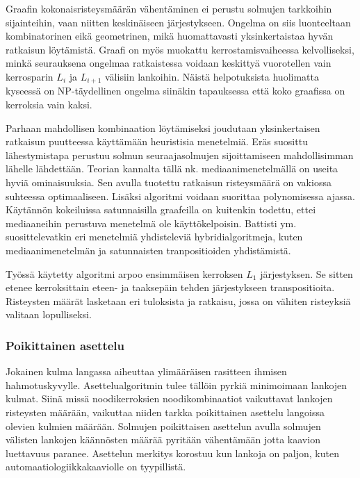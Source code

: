 \documentclass[finnish,12pt]{article}
\begin{document}
Graafin kokonaisristeysmäärän vähentäminen ei perustu solmujen tarkkoihin sijainteihin, vaan niitten keskinäiseen järjestykseen.
Ongelma on siis luonteeltaan kombinatorinen eikä geometrinen, mikä huomattavasti yksinkertaistaa hyvän ratkaisun löytämistä.
Graafi on myös muokattu kerrostamisvaiheessa kelvolliseksi, minkä seurauksena ongelmaa ratkaistessa voidaan keskittyä vuorotellen vain kerrosparin $L_i$ ja $L_{i+1}$ välisiin lankoihin.
Näistä helpotuksista huolimatta kyseessä on NP-täydellinen ongelma siinäkin tapauksessa että koko graafissa on kerroksia vain kaksi. \cite{RefWorks:40}

Parhaan mahdollisen kombinaation löytämiseksi joudutaan yksinkertaisen ratkaisun puutteessa käyttämään heuristisia menetelmiä.
Eräs suosittu lähestymistapa perustuu solmun seuraajasolmujen sijoittamiseen mahdollisimman lähelle lähdettään.
Teorian kannalta tällä nk. mediaanimenetelmällä on useita hyviä ominaisuuksia.
Sen avulla tuotettu ratkaisun risteysmäärä on vakiossa suhteessa optimaaliseen.
Lisäksi algoritmi voidaan suorittaa polynomisessa ajassa.
Käytännön kokeiluissa satunnaisilla graafeilla on kuitenkin todettu, ettei mediaaneihin perustuva menetelmä ole käyttökelpoisin. \cite{RefWorks:52}
Battisti ym. suosittelevatkin eri menetelmiä yhdisteleviä hybridialgoritmeja, kuten mediaanimenetelmän ja satunnaisten tranpositioiden yhdistämistä\cite{RefWorks:39}.

Työssä käytetty algoritmi arpoo ensimmäisen kerroksen $L_1$ järjestyksen.
Se sitten etenee kerroksittain eteen- ja taaksepäin tehden järjestykseen transpositioita.
Risteysten määrät lasketaan eri tuloksista ja ratkaisu, jossa on vähiten risteyksiä valitaan lopulliseksi.


		\subsubsection{Poikittainen asettelu}

Jokainen kulma langassa aiheuttaa ylimääräisen rasitteen ihmisen hahmotuskyvylle. \cite{RefWorks:47}
Asettelualgoritmin tulee tällöin pyrkiä minimoimaan lankojen kulmat.
Siinä missä noodikerroksien noodikombinaatiot vaikuttavat lankojen risteysten määrään, vaikuttaa niiden tarkka poikittainen asettelu langoissa olevien kulmien määrään.
Solmujen poikittaisen asettelun avulla solmujen välisten lankojen käännösten määrää pyritään vähentämään jotta kaavion luettavuus paranee.
Asettelun merkitys korostuu kun lankoja on paljon, kuten automaatiologiikkakaaviolle on tyypillistä.
\end{document}
